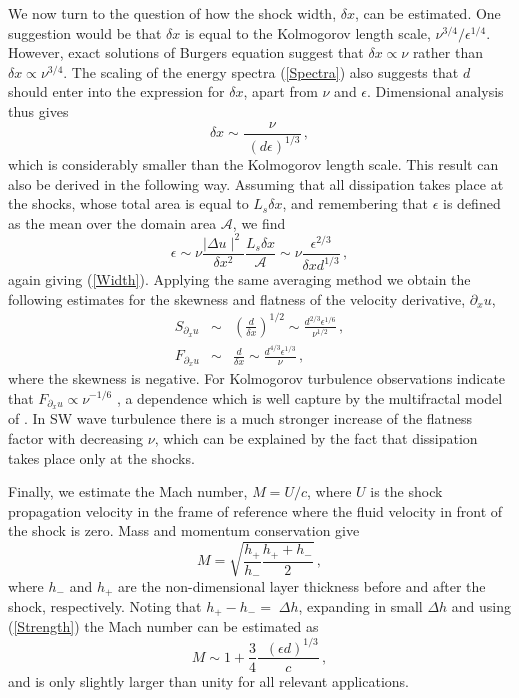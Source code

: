We now turn to the question of how the shock width, $ \delta x $, can be estimated. One suggestion would be that $ \delta x $  is equal to the Kolmogorov length scale, $ \nu^{3/4}/\epsilon^{1/4} $. However, exact solutions of Burgers equation \citep[see for example][]{Whitham}
suggest that  $ \delta x \propto \nu $ rather than $ \delta x \propto \nu ^{3/4} $. The scaling of the energy spectra (\ref{Spectra}) also suggests that $ d $ should enter into the expression for $ \delta x$, apart from $ \nu $ and $ \epsilon $. Dimensional analysis thus gives
\begin{equation} \label{Width}
\delta x \sim \frac{\nu}{\; (d\epsilon)^{1/3}} \, ,
\end{equation}
which is considerably smaller than the Kolmogorov length scale.
This result can also be derived in the following way. Assuming that all dissipation
takes place at the shocks, whose total area is equal to $ L_s \delta x $,  and
remembering that $ \epsilon $ is defined as the mean over the domain area $ \mathcal{A}$, we find
\begin{equation} \label{Estimate}
\epsilon \sim \nu \frac{ \mid \Delta u \mid ^{2} }{\delta x^2} \frac{L_s \delta x}{\mathcal{A}} \sim \nu \frac{\epsilon^{2/3}} {\delta x d^{1/3}} \, ,
\end{equation}
again giving (\ref{Width}).
Applying the same averaging method we obtain the following estimates for the skewness and flatness of the velocity derivative, $ \partial_x u $,
\begin{eqnarray}
S_{\partial_x u}  & \sim & \left ( \frac{d}{\delta x} \right )^{1/2} \sim \frac{d^{2/3} \epsilon ^{1/6}}{\nu^{1/2}} \, , \\
\label{FD} F_{\partial_x u} & \sim &  \frac{d}{\delta x} \sim \frac{d^{4/3} \epsilon^{1/3}} {\nu} \, ,
\end{eqnarray}
where the skewness is negative. For Kolmogorov turbulence observations indicate that $ F_{\partial_x u} \propto \nu^{-1/6} $  \citep[]{VanAtta_Antonia1980}, a dependence which is well capture by the multifractal model of
\cite{Meneveau_Streenivasan1991}.  In SW wave turbulence there is a much
stronger increase of  the flatness factor with decreasing  $ \nu $, which can
be explained by the fact that dissipation takes place only at the shocks.

Finally, we estimate the Mach number, $ M = U/c $, where $ U $ is the shock propagation velocity in the frame of reference where the fluid velocity in front of the shock is zero.
Mass and momentum conservation give \citep[see][]{Baines1998}
\begin{equation}
M = \sqrt{\frac{h_+}{h_-} \frac{h_+  + h_-}{2}} \, ,
\end{equation}
where $ h_- $ and $ h_+ $ are the non-dimensional layer thickness before and after the shock, respectively. Noting that $ h_+ - h_- =  \;  \Delta h  $, expanding in small $ \Delta h  $ and using (\ref{Strength}) the Mach number can be estimated as
\begin{equation} \label{Mach}
M \sim 1 + \frac{3}{4} \frac{\;\; (\epsilon d)^{1/3}}{c} \, ,
\end{equation}
and is only slightly larger than unity for all relevant applications.

